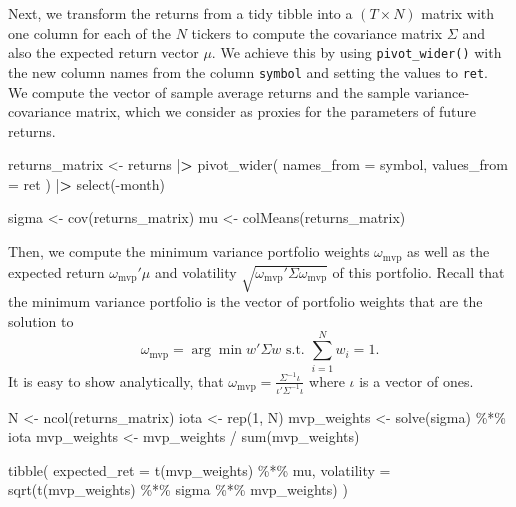 \documentclass[
]{krantz}
\newenvironment{Shaded}{\begin{snugshade}}{\end{snugshade}}
\newcommand{\AttributeTok}[1]{\textcolor[rgb]{0.61,0.61,0.61}{#1}}
\newcommand{\DecValTok}[1]{\textcolor[rgb]{0.06,0.06,0.06}{#1}}
\newcommand{\ErrorTok}[1]{\textcolor[rgb]{0.14,0.14,0.14}{\textbf{#1}}}
\newcommand{\FunctionTok}[1]{\textcolor[rgb]{0,0,0}{#1}}
\newcommand{\NormalTok}[1]{#1}
\newcommand{\OtherTok}[1]{\textcolor[rgb]{0.37,0.37,0.37}{#1}}
\newcommand{\SpecialCharTok}[1]{\textcolor[rgb]{0,0,0}{#1}}
\begin{document}
Next, we transform the returns from a tidy tibble into a \((T \times N)\) matrix with one column for each of the \(N\) tickers to compute the covariance matrix \(\Sigma\) and also the expected return vector \(\mu\). We achieve this by using \texttt{pivot\_wider()} with the new column names from the column \texttt{symbol} and setting the values to \texttt{ret}.
We compute the vector of sample average returns and the sample variance-covariance matrix, which we consider as proxies for the parameters of future returns.

\begin{Shaded}
\begin{Highlighting}[]
\NormalTok{returns\_matrix }\OtherTok{\textless{}{-}}\NormalTok{ returns }\SpecialCharTok{|}\ErrorTok{\textgreater{}}
  \FunctionTok{pivot\_wider}\NormalTok{(}
    \AttributeTok{names\_from =}\NormalTok{ symbol,}
    \AttributeTok{values\_from =}\NormalTok{ ret}
\NormalTok{  ) }\SpecialCharTok{|}\ErrorTok{\textgreater{}}
  \FunctionTok{select}\NormalTok{(}\SpecialCharTok{{-}}\NormalTok{month)}

\NormalTok{sigma }\OtherTok{\textless{}{-}} \FunctionTok{cov}\NormalTok{(returns\_matrix)}
\NormalTok{mu }\OtherTok{\textless{}{-}} \FunctionTok{colMeans}\NormalTok{(returns\_matrix)}
\end{Highlighting}
\end{Shaded}

Then, we compute the minimum variance portfolio weights \(\omega_\text{mvp}\) as well as the expected return \(\omega_\text{mvp}'\mu\) and volatility \(\sqrt{\omega_\text{mvp}'\Sigma\omega_\text{mvp}}\) of this portfolio. Recall that the minimum variance portfolio is the vector of portfolio weights that are the solution to
\[\omega_\text{mvp} = \arg\min w'\Sigma w \text{ s.t. } \sum\limits_{i=1}^Nw_i = 1.\]
It is easy to show analytically, that \(\omega_\text{mvp} = \frac{\Sigma^{-1}\iota}{\iota'\Sigma^{-1}\iota}\) where \(\iota\) is a vector of ones.

\begin{Shaded}
\begin{Highlighting}[]
\NormalTok{N }\OtherTok{\textless{}{-}} \FunctionTok{ncol}\NormalTok{(returns\_matrix)}
\NormalTok{iota }\OtherTok{\textless{}{-}} \FunctionTok{rep}\NormalTok{(}\DecValTok{1}\NormalTok{, N)}
\NormalTok{mvp\_weights }\OtherTok{\textless{}{-}} \FunctionTok{solve}\NormalTok{(sigma) }\SpecialCharTok{\%*\%}\NormalTok{ iota}
\NormalTok{mvp\_weights }\OtherTok{\textless{}{-}}\NormalTok{ mvp\_weights }\SpecialCharTok{/} \FunctionTok{sum}\NormalTok{(mvp\_weights)}

\FunctionTok{tibble}\NormalTok{(}
  \AttributeTok{expected\_ret =} \FunctionTok{t}\NormalTok{(mvp\_weights) }\SpecialCharTok{\%*\%}\NormalTok{ mu,}
  \AttributeTok{volatility =} \FunctionTok{sqrt}\NormalTok{(}\FunctionTok{t}\NormalTok{(mvp\_weights) }\SpecialCharTok{\%*\%}\NormalTok{ sigma }\SpecialCharTok{\%*\%}\NormalTok{ mvp\_weights)}
\NormalTok{)}
\end{Highlighting}
\end{Shaded}
\end{document}
